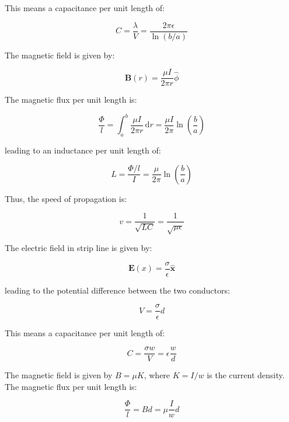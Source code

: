 \documentclass[12pt]{article}
\begin{document}
This means a capacitance per unit length of:

\begin{equation}
    C = \frac{\lambda}{V} = \frac{2\pi\epsilon}{\ln{(b/a)}}
\end{equation}

The magnetic field is given by:

\begin{equation}
    \mathbf{B}(r) = \frac{\mu I}{2\pi r} \hat{\phi}
\end{equation}

The magnetic flux per unit length is:

\begin{equation}
    \frac{\Phi}{l} = \int_{a}^{b} \frac{\mu I}{2\pi r} \, \mathrm{d}r = \frac{\mu I}{2\pi} \ln{\left( \frac{b}{a} \right)}
\end{equation}

leading to an inductance per unit length of:

\begin{equation}
    L = \frac{\Phi/l}{I} = \frac{\mu}{2\pi} \ln{\left( \frac{b}{a} \right)}
\end{equation}

Thus, the speed of propagation is:

\begin{equation}
    v = \frac{1}{\sqrt{LC}} = \frac{1}{\sqrt{\mu\epsilon}}
\end{equation}

The electric field in strip line is given by:

\begin{equation}
    \mathbf{E}(x) = \frac{\sigma}{\epsilon} \hat{\mathbf{x}}
\end{equation}

leading to the potential difference between the two conductors:

\begin{equation}
    V = \frac{\sigma}{\epsilon} d
\end{equation}

This means a capacitance per unit length of:

\begin{equation}
    C = \frac{\sigma w}{V} = \epsilon \frac{w}{d}
\end{equation}

The magnetic field is given by $B = \mu K$, where $K = I/w$ is the current density. The magnetic flux per unit length is:

\begin{equation}
    \frac{\Phi}{l} = Bd = \mu \frac{I}{w} d
\end{equation}
\end{document}
